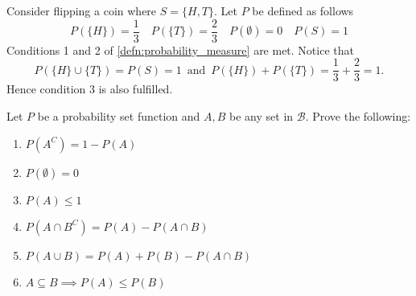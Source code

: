 \documentclass[notoc,notitlepage]{tufte-book}
\begin{document}
\begin{eg}
  \label{eg:probability_measure}
  Consider flipping a coin where $S = \{H, T\}$. Let $P$ be defined as follows
  \begin{equation*}
    P(\{H\}) = \frac{1}{3} \quad P(\{T\}) = \frac{2}{3} \quad P(\emptyset) = 0 \quad  P(S) = 1
  \end{equation*}
  Conditions 1 and 2 of \cref{defn:probability_measure} are met. Notice that
  \begin{equation*}
    P(\{H\} \cup \{T\}) = P(S) = 1 \enspace \text{and} \enspace P(\{H\}) + P(\{T\}) = \frac{1}{3} + \frac{2}{3} = 1.
  \end{equation*}
  Hence condition 3 is also fulfilled.
\end{eg}

\begin{propo}\label{propo:properties_of_probability_set_functions}
  Let $P$ be a probability set function and $A, B$ be any set in $\mathscr{B}$. Prove the following:
  \begin{enumerate}
    \item $P(A^C) = 1 - P(A)$
    \item $P(\emptyset) = 0$
    \item $P(A) \leq 1$
    \item $P(A \cap B^C) = P(A) - P(A \cap B)$
    \item $P(A \cup B) = P(A) + P(B) - P(A \cap B)$
    \item $A \subseteq B \implies P(A) \leq P(B)$
  \end{enumerate}
\end{propo}
\end{document}
